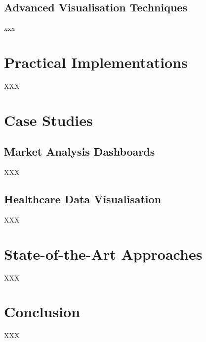\documentclass{article}\usepackage[]{graphicx}\usepackage[]{xcolor}
\begin{document}
\subsection{Advanced Visualisation Techniques}
xxx




\section{Practical Implementations}
XXX




\section{Case Studies}
\subsection{Market Analysis Dashboards}
XXX
\subsection{Healthcare Data Visualisation}
XXX




\section{State-of-the-Art Approaches}
XXX


\section{Conclusion}

XXX
\end{document}

